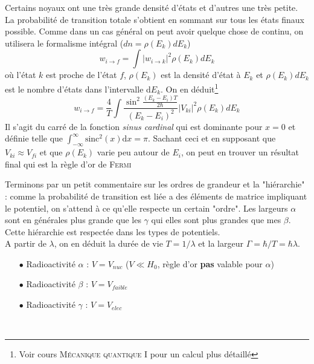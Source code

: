 Certains noyaux ont une très grande densité d'états et d'autres une très petite. La probabilité de transition
totale s'obtient en sommant sur tous les états finaux possible. Comme dans un cas général on peut avoir
quelque chose de continu, on utilisera le formalisme intégral ($dn=\rho(E_k)dE_k$)
\begin{equation}
w_{i\to f} = \int|w_{i\to k}|^2 \rho(E_k)dE_k
\end{equation}
où l'état $k$ est proche de l'état $f$, $\rho(E_k)$ est la densité d'état à $E_k$ et 
$\rho(E_k)dE_k$ est le nombre d'états dans l'intervalle d$E_k$. On en déduit\footnote{Voir cours 
\textsc{Mécanique quantique I} pour un calcul plus détaillé}
\begin{equation}
w_{i\to f} = \dfrac{4}{T}\int\dfrac{\sin^2\frac{(E_k-E_i)T}{2\hbar}}{(E_k-E_i)^2}|V_{ki}|^2\rho(E_k)dE_k
\end{equation}
Il s'agit du carré de la fonction \textit{sinus cardinal} qui est dominante pour $x=0$ et définie telle 
que $\int_{-\infty}^\infty \text{sinc}^2(x)\text{d}x=\pi$. Sachant ceci et en supposant que 
$V_{ki}\approx V_{fi}$ et que $\rho(E_k)$ varie peu autour de $E_i$, on peut en trouver un résultat final
qui est la règle d'or de \textsc{Fermi}\\



Terminons par un petit commentaire sur les ordres de grandeur et la "hiérarchie" : comme la probabilité de
transition est liée a des éléments de matrice impliquant le potentiel, on s'attend à ce qu'elle respecte un 
certain "ordre". Les largeurs $\alpha$ sont en générales plus grande que les $\gamma$ qui elles sont plus 
grandes que mes $\beta$. Cette hiérarchie est respectée dans les types de potentiels.\\

A partir de $\lambda$, on en déduit la durée de vie $T=1/\lambda$ et la largeur $\Gamma = \hbar/T=\hbar\lambda$.
\begin{itemize}
\item[$\bullet$] Radioactivité $\alpha$ : $V=V_{nuc}$ ($V\ll H_0$, règle d'or \textbf{pas} valable pour $\alpha$)
\item[$\bullet$] Radioactivité $\beta$ : $V=V_{faible}$ 
\item[$\bullet$] Radioactivité $\gamma$ : $V=V_{elec}$ 
\end{itemize}\

